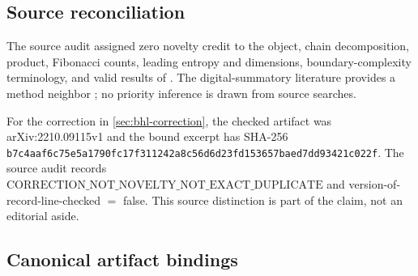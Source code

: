 \subsection{Source reconciliation}

The source audit assigned zero novelty credit to the object, chain
decomposition, product, Fibonacci counts, leading entropy and dimensions,
boundary-complexity terminology, and valid results of
\citet{fan2012level,kenyon2012hausdorff,ban2019pattern,ban2023boundary,ban2025affine}.
The digital-summatory literature provides a method neighbor
\citep{madritsch2012summatory}; no priority inference is drawn from source
searches.

For the correction in \cref{sec:bhl-correction}, the checked artifact was
arXiv:2210.09115v1 and the bound excerpt has SHA-256
\nolinkurl{b7c4aaf6c75e5a1790fc17f311242a8c56d6d23fd153657baed7dd93421c022f}.
The source audit records
\(\mathrm{CORRECTION\_NOT\_NOVELTY\_NOT\_EXACT\_DUPLICATE}\) and
version-of-record-line-checked \(=\) false.  This source distinction is part
of the claim, not an editorial aside.

\subsection{Canonical artifact bindings}
\label{app:artifact-bindings}

